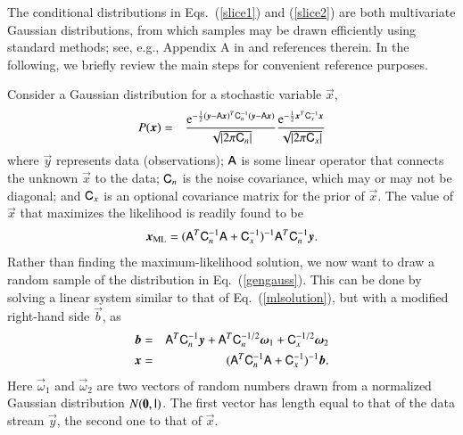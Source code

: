 \documentclass[twocolumn]{aa}
\newcommand{\ve}[1]{{\vec #1}}
\newcommand{\ma}[1]{\tens{#1}}
\newcommand{\pcal}{{P}}
\newcommand{\e}{\mathrm{e}}
\begin{document}
The conditional distributions in Eqs.~(\ref{slice1}) and (\ref{slice2})
are both multivariate Gaussian distributions, from which samples may
be drawn efficiently using standard methods; see, e.g., Appendix A in
\citet{bp01} and references therein. In the following, we briefly
review the main steps for convenient reference purposes.

Consider a Gaussian distribution for a stochastic variable $\ve x$,
%
\begin{eqnarray}
\pcal(\ve x) &=& \frac{\e^{-\frac12 (\ve y-\ma A\ve x)^T\ma C_n^{-1} (\ve y-\ma
    A\ve x)}}{\sqrt{|2\pi\ma C_n|}} \frac{\e^{-\frac12 \ve x^T\ma C_x^{-1} \ve
    x}}{\sqrt{|2\pi\ma C_x|}} \label{gengauss}
\end{eqnarray}
%
where $\ve y$ represents data (observations); $\ma A$ is some linear operator
that connects the unknown $\ve x$ to the data;
$\ma C_n$ is the noise covariance, which may or may not be diagonal;
and $\ma C_x$ is an optional covariance matrix for the prior of $\ve x$.
%
The value of $\ve x$ that maximizes the likelihood is readily found to be
%
\begin{equation}
\ve x_{\rm ML} = (\ma A^T \ma C_n^{-1}\ma A +\ma C_x^{-1})^{-1} \ma A^T \ma C_n^{-1} \ve y  \label{mlsolution}.
\end{equation}
%
Rather than finding the maximum-likelihood solution,
we now want to draw a random sample of the distribution in Eq.~(\ref{gengauss}).
This can be done by solving a linear system similar to that of Eq.~(\ref{mlsolution}),
but with a modified right-hand side $\ve b$, as
%
\begin{eqnarray}
\ve b &=&  \ma A^T \ma C_n^{-1} \ve y  
        +\ma A^T\ma C_n^{-1/2}\ve\omega_1 
        +\ma C_x^{-1/2}\ve\omega_2  \nonumber \\
\ve x  &=& (\ma A^T \ma C_n^{-1}\ma A +\ma C_x^{-1})^{-1} \ve b. \label{gibbssolution}
\end{eqnarray}
%
Here $\ve\omega_1$ and $\ve\omega_2$
are two vectors of random numbers drawn from a normalized 
Gaussian distribution $N(\ve 0,\tens I)$.
The first vector has length equal to that of the data stream $\ve y$,
the second one to that of $\ve x$.
\end{document}
